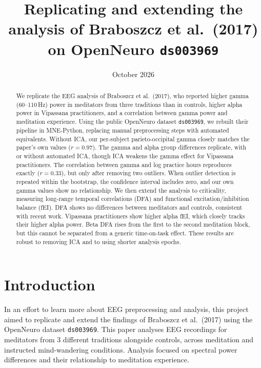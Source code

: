 \documentclass[10pt,a4paper]{article}
\title{Replicating and extending the analysis of Braboszcz et al.\ (2017) on OpenNeuro \texttt{ds003969}}
\date{October 2026}
\begin{document}
\maketitle

\begin{abstract}
We replicate the EEG analysis of Braboszcz et al.\ (2017), who reported higher gamma (60--110\,Hz) power in meditators
from three traditions than in controls, higher alpha power in Vipassana practitioners, and a correlation between
gamma power and meditation experience. Using the public OpenNeuro dataset \texttt{ds003969}, we rebuilt their pipeline
in MNE-Python, replacing manual preprocessing steps with automated equivalents. Without ICA,
our per-subject parieto-occipital gamma closely matches the paper's own values ($r = 0.97$). The gamma and alpha
group differences replicate, with or without automated ICA, though ICA weakens the gamma effect for Vipassana
practitioners. The correlation between gamma and log practice hours reproduces exactly ($r = 0.33$),
but only after removing two outliers. When outlier detection is repeated within the bootstrap, the confidence
interval includes zero, and our own gamma values show no relationship. We then extend the analysis to criticality,
measuring long-range temporal correlations (DFA) and functional excitation/inhibition balance (fEI). DFA shows no
differences between meditators and controls, consistent with recent work. Vipassana practitioners show higher alpha
fEI, which closely tracks their higher alpha power. Beta DFA rises from the first to the second meditation block, but
this cannot be separated from a generic time-on-task effect. These results are robust to removing ICA and to using
shorter analysis epochs.
\end{abstract}

\section{Introduction}

In an effort to learn more about EEG preprocessing and analysis, this project aimed to replicate and 
extend the findings of Braboszcz et al.\ (2017) using the OpenNeuro dataset \texttt{ds003969}. This paper 
analyses EEG recordings for meditators from 3 different traditions alongside controls, across meditation and
instructed mind-wandering conditions. Analysis focused on spectral power differences and their relationship 
to meditation experience.
\end{document}
